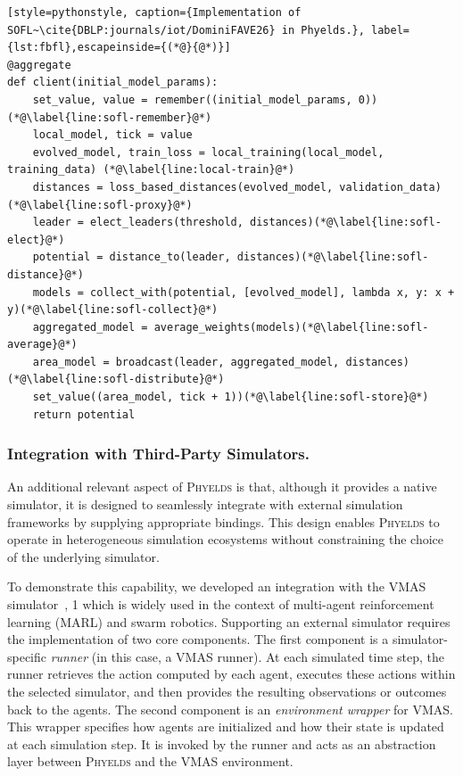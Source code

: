 \documentclass[runningheads]{llncs}
\begin{document}
\begin{lstlisting}[style=pythonstyle, caption={Implementation of SOFL~\cite{DBLP:journals/iot/DominiFAVE26} in Phyelds.}, label={lst:fbfl},escapeinside={(*@}{@*)}]
@aggregate
def client(initial_model_params):
    set_value, value = remember((initial_model_params, 0))(*@\label{line:sofl-remember}@*)
    local_model, tick = value
    evolved_model, train_loss = local_training(local_model, training_data) (*@\label{line:local-train}@*)
    distances = loss_based_distances(evolved_model, validation_data)(*@\label{line:sofl-proxy}@*)
    leader = elect_leaders(threshold, distances)(*@\label{line:sofl-elect}@*)
    potential = distance_to(leader, distances)(*@\label{line:sofl-distance}@*)
    models = collect_with(potential, [evolved_model], lambda x, y: x + y)(*@\label{line:sofl-collect}@*)
    aggregated_model = average_weights(models)(*@\label{line:sofl-average}@*)
    area_model = broadcast(leader, aggregated_model, distances)(*@\label{line:sofl-distribute}@*)
    set_value((area_model, tick + 1))(*@\label{line:sofl-store}@*)
    return potential
\end{lstlisting}

\subsubsection{Integration with Third-Party Simulators.}\label{sec:vmas}

An additional relevant aspect of \textsc{Phyelds} is that, 
 although it provides a native simulator, 
 it is designed to seamlessly integrate with external simulation frameworks 
 by supplying appropriate bindings. 
% 
This design enables \textsc{Phyelds} to operate in heterogeneous simulation ecosystems 
 without constraining the choice of the underlying simulator.

To demonstrate this capability, 
 we developed an integration with the VMAS simulator~\cite{bettini2022dars}, 
1 which is widely used in the context of multi-agent reinforcement learning (MARL) and swarm robotics.
% 
Supporting an external simulator requires the implementation of two core components.
%
The first component is a simulator-specific \emph{runner} (in this case, a VMAS runner). 
%
At each simulated time step, 
 the runner retrieves the action computed by each agent, 
 executes these actions within the selected simulator, 
 and then provides the resulting observations or outcomes back to the agents.
%
The second component is an \emph{environment wrapper} for VMAS. 
%
This wrapper specifies how agents are initialized and 
 how their state is updated at each simulation step. 
% 
It is invoked by the runner and acts as an abstraction layer 
 between \textsc{Phyelds} and the VMAS environment.
\end{document}
